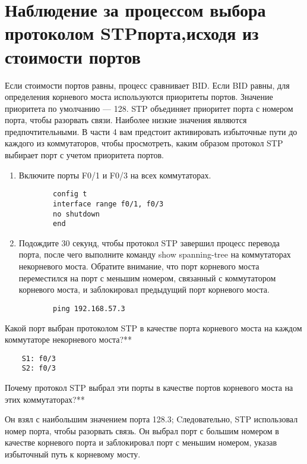 \section{Наблюдение за процессом выбора протоколом STPпорта,исходя из стоимости портов}
Если стоимости портов равны, процесс сравнивает BID. Если BID равны, для определения корневого
моста используются приоритеты портов.
Значение приоритета по умолчанию — 128.
STP объединяет приоритет порта с номером порта, чтобы разорвать связи.
Наиболее низкие значения являются предпочтительными.
В части 4 вам предстоит активировать избыточные пути до каждого из коммутаторов, чтобы просмотреть, каким образом
протокол STP выбирает порт с учетом приоритета портов.

\begin{enumerate}[a]
    \item Включите порты F0/1 и F0/3 на всех коммутаторах.
    \begin{verbatim}
        config t
        interface range f0/1, f0/3
        no shutdown
        end
    \end{verbatim}

    \item Подождите 30 секунд, чтобы протокол STP завершил процесс перевода порта, после чего
    выполните команду show spanning-tree на коммутаторах некорневого моста.
    Обратите внимание, что порт корневого моста переместился на порт с меньшим номером, связанный с коммутатором
    корневого моста, и заблокировал предыдущий порт корневого моста.
    \begin{verbatim}
        ping 192.168.57.3
    \end{verbatim}
\end{enumerate}

Какой порт выбран протоколом STP в качестве порта корневого моста на каждом коммутаторе некорневого моста?**
\begin{verbatim}
    S1: f0/3
    S2: f0/3
\end{verbatim}
Почему протокол STP выбрал эти порты в качестве портов корневого моста на этих коммутаторах?**

Он взял с наибольшим значением порта 128.3;
Cледовательно, STP использовал номер порта, чтобы разорвать связь.
Он выбрал порт с большим номером в качестве корневого порта
и заблокировал порт с меньшим номером,
указав избыточный путь к корневому мосту.
